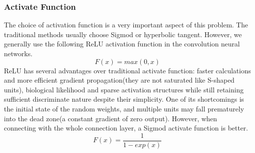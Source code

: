 

\subsubsection{Activate Function}
The choice of activation function is a very important aspect of this problem. The traditional methods usually choose Sigmod or hyperbolic tangent. However, we generally use the following ReLU activation function in the convolution neural networks.
\begin{equation}
F(x) = max (0, x)
\end{equation}
ReLU has several advantages over traditional activate function: faster calculations and more efficient gradient propagation(they are not saturated like S-shaped units), biological likelihood and sparse activation structures while still retaining sufficient discriminate nature despite their simplicity. One of its shortcomings is the initial state of the random weights, and multiple units may fall prematurely into the dead zone(a constant gradient of zero output). However, when connecting with the whole connection layer, a Sigmod activate function is better.
\begin{equation}
F(x) = \frac{1}{1-exp(x)}
\end{equation}

